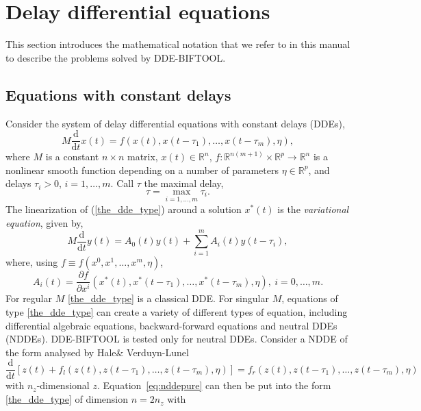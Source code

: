 \documentclass[10pt]{scrartcl}
\newcommand{\DDEBIFCODE}{\textsc{DDE-BIFTOOL}}
\newcommand{\define}[1]{\emph{#1}}
\renewcommand{\d}{\mathrm{d}}
\newcommand{\RR}{\mathbb{R}}
\begin{document}
\section{Delay differential equations}\label{explain_dde}
\label{sec:ddes}
This section introduces the mathematical notation that we refer to in
this manual to describe the problems solved by \DDEBIFCODE{}.
\subsection{Equations with constant delays}\label{dde}

Consider the system of delay differential equations with constant
delays (DDEs),
\begin{equation}\label{the_dde_type}
M\frac{\d}{\d t}{x(t)}=f(x(t),x(t-\tau_1),\ldots,x(t-\tau_m),\eta),
\end{equation}
where $M$ is a constant $n\times n$ matrix, $x(t)\in\RR^n$,
$f:\RR^{n(m+1)}\times\RR^p \rightarrow\RR^n$ is a nonlinear smooth
function depending on a number of parameters $\eta\in\RR^p$, and
delays $\tau_i>0$, $i=1,\ldots,m$.  Call $\tau$ the maximal delay,
\[
\tau=\max_{i=1,\ldots,m}\tau_i.
\]
The linearization of (\ref{the_dde_type}) around a solution $x^*(t)$ 
is the \define{variational equation}, given by,
\begin{equation}\label{the_var_equa}
M\frac{\d}{\d t}{y(t)}=A_0(t)y(t)+\sum_{i=1}^m A_i(t)y(t-\tau_i),
\end{equation}
where, using $f\equiv f(x^0,x^1,\ldots,x^m,\eta)$,  
\begin{equation}\label{A_def}
A_i(t)=\frac{\partial f}{\partial x^i}(x^*(t),x^*(t-\tau_1),\ldots,x^*(t-\tau_m),\eta), 
\ i=0,\ldots,m. 
\end{equation}
For regular $M$ \cref{the_dde_type} is a classical DDE. For singular
$M$, equations of type \eqref{the_dde_type} can create a variety of
different types of equation, including differential algebraic
equations, backward-forward equations and neutral DDEs (NDDEs). \DDEBIFCODE{}
is tested only for neutral DDEs. Consider a NDDE of the form analysed by Hale\& Verduyn-Lunel \cite{Hale93}
\begin{equation}
  \label{eq:nddepure}
  \frac{\d}{\d t}\left[z(t)+f_l(z(t),z(t-\tau_1),\ldots,z(t-\tau_m),\eta)\right]
  =f_r(z(t),z(t-\tau_1),\ldots,z(t-\tau_m),\eta)
\end{equation}
with $n_z$-dimensional $z$.
Equation~\eqref{eq:nddepure} can then be put into the form \eqref{the_dde_type} of dimension $n=2n_z$ with
\end{document}
